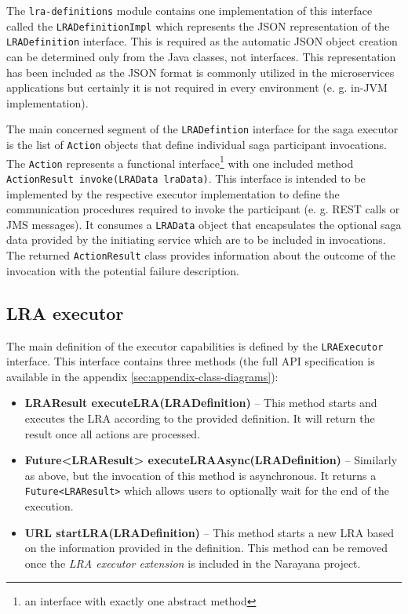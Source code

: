 \documentclass[oneside,
  digital, %
  table,   %
  lof,     %
  lot,     %
]{fithesis3}
\begin{document}
The \texttt{lra-definitions} module contains one implementation of this interface called the \texttt{LRADefinitionImpl} which represents the JSON representation of the \texttt{LRADefinition} interface. This is required as the automatic JSON object creation can be determined only from the Java classes, not interfaces. This representation has been included as the JSON format is commonly utilized in the microservices applications but certainly it is not required in every environment (e. g. in-JVM implementation).

The main concerned segment of the \texttt{LRADefintion} interface for the saga executor is the list of \texttt{Action} objects that define individual saga participant invocations. The \texttt{Action} represents a functional interface\footnote{an interface with exactly one abstract method} with one included method \texttt{ActionResult invoke(LRAData lraData)}. This interface is intended to be implemented by the respective executor implementation to define the communication procedures required to invoke the participant (e. g. REST calls or JMS messages). It consumes a \texttt{LRAData} object that encapsulates the optional saga data provided by the initiating service which are to be included in invocations. The returned \texttt{ActionResult} class provides information about the outcome of the invocation with the potential failure description.

\subsection{LRA executor}

The main definition of the executor capabilities is defined by the \texttt{LRAExecutor} interface. This interface contains three methods (the full API specification is available in the appendix \ref{sec:appendix-class-diagrams}):

\begin{itemize}
    \item \textbf{LRAResult executeLRA(LRADefinition)} -- This method starts and executes the LRA according to the provided definition. It will return the result once all actions are processed.
    
    \item \textbf{Future<LRAResult> executeLRAAsync(LRADefinition)} -- Similarly as above, but the invocation of this method is asynchronous. It returns a \texttt{Future<LRAResult>} which allows users to optionally wait for the end of the execution.
    
    \item \textbf{URL startLRA(LRADefinition)} -- This method starts a new LRA based on the information provided in the definition. This method can be removed once the \textit{LRA executor extension} is included in the Narayana project.
\end{itemize}
\end{document}
